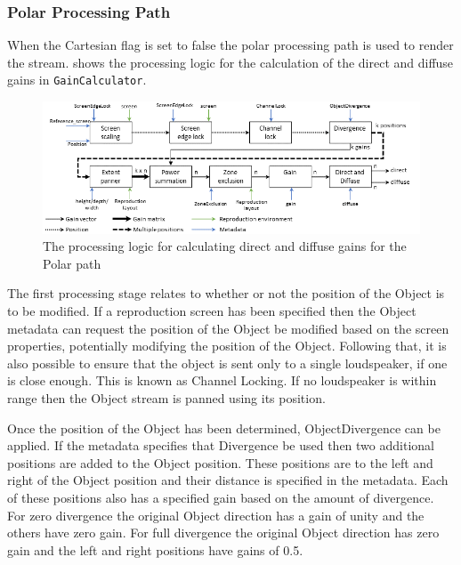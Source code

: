 \documentclass[12pt]{report}
\newcommand{\code}[1]{\texttt{#1}}
\begin{document}
\subsubsection{Polar Processing Path}

When the Cartesian flag is set to false the polar processing path is used to render the stream.
 shows the processing logic for the calculation of the direct and diffuse gains in \code{GainCalculator}.

\begin{figure}
    \centering
    \includegraphics[width = \textwidth]{figures/ObjectPannerSignalFlow.png}
    \caption{The processing logic for calculating direct and diffuse gains for the Polar path}
    \label{fig:adm_object_polar}
\end{figure}

The first processing stage relates to whether or not the position of the Object is to be modified.
If a reproduction screen has been specified then the Object metadata can request the position of the Object be modified based on the screen properties, potentially modifying the position of the Object.
Following that, it is also possible to ensure that the object is sent only to a single loudspeaker, if one is close enough.
This is known as Channel Locking.
If no loudspeaker is within range then the Object stream is panned using its position.

Once the position of the Object has been determined, ObjectDivergence can be applied.
If the metadata specifies that Divergence be used then two additional positions are added to the Object position.
These positions are to the left and right of the Object position and their distance is specified in the metadata.
Each of these positions also has a specified gain based on the amount of divergence.
For zero divergence the original Object direction has a gain of unity and the others have zero gain.
For full divergence the original Object direction has zero gain and the left and right positions have gains of 0.5.
\end{document}

